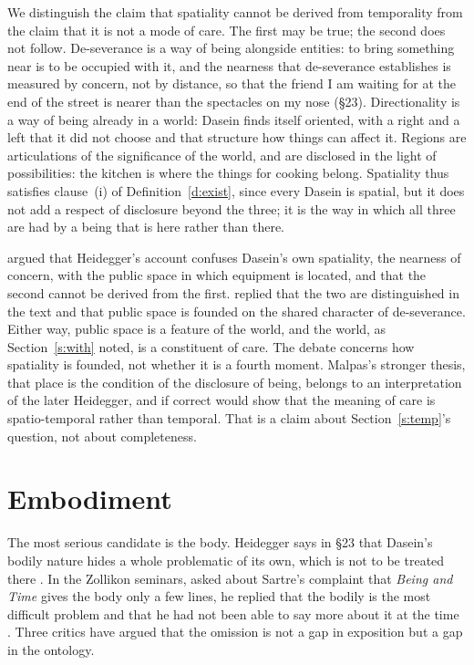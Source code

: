 \documentclass{situationist-preprint}
\begin{document}
We distinguish the claim that spatiality cannot be derived from temporality from the claim that it is not a mode of care. The first may be true; the second does not follow. De-severance is a way of being alongside entities: to bring something near is to be occupied with it, and the nearness that de-severance establishes is measured by concern, not by distance, so that the friend I am waiting for at the end of the street is nearer than the spectacles on my nose (\S23). Directionality is a way of being already in a world: Dasein finds itself oriented, with a right and a left that it did not choose and that structure how things can affect it. Regions are articulations of the significance of the world, and are disclosed in the light of possibilities: the kitchen is where the things for cooking belong. Spatiality thus satisfies clause~(i) of Definition~\ref{d:exist}, since every Dasein is spatial, but it does not add a respect of disclosure beyond the three; it is the way in which all three are had by a being that is here rather than there.

\citet{Dreyfus1991} argued that Heidegger's account confuses Dasein's own spatiality, the nearness of concern, with the public space in which equipment is located, and that the second cannot be derived from the first. \citet{Arisaka1995} replied that the two are distinguished in the text and that public space is founded on the shared character of de-severance. Either way, public space is a feature of the world, and the world, as Section~\ref{s:with} noted, is a constituent of care. The debate concerns how spatiality is founded, not whether it is a fourth moment. Malpas's stronger thesis, that place is the condition of the disclosure of being, belongs to an interpretation of the later Heidegger, and if correct would show that the meaning of care is spatio-temporal rather than temporal. That is a claim about Section~\ref{s:temp}'s question, not about completeness.

\section{Embodiment}\label{s:body}

The most serious candidate is the body. Heidegger says in \S23 that Dasein's bodily nature hides a whole problematic of its own, which is not to be treated there \citep[\S23]{Heidegger1927}. In the Zollikon seminars, asked about Sartre's complaint that \emph{Being and Time} gives the body only a few lines, he replied that the bodily is the most difficult problem and that he had not been able to say more about it at the time \citep{Heidegger1987}. Three critics have argued that the omission is not a gap in exposition but a gap in the ontology.
\end{document}
